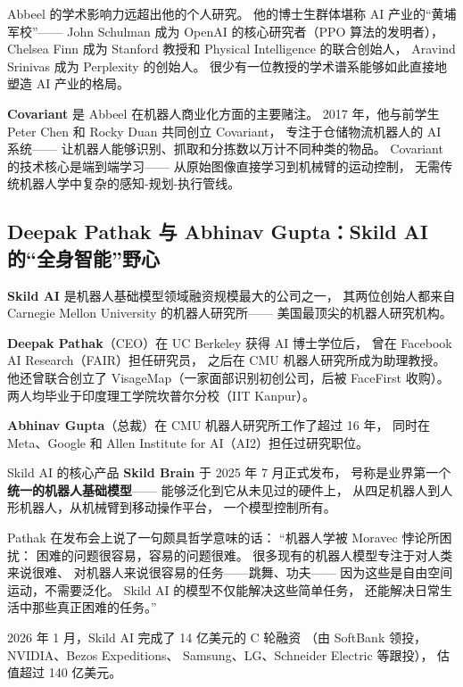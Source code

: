 Abbeel 的学术影响力远超出他的个人研究。
他的博士生群体堪称 AI 产业的``黄埔军校''——
John Schulman 成为 OpenAI 的核心研究者（PPO 算法的发明者），
Chelsea Finn 成为 Stanford 教授和 Physical Intelligence 的联合创始人，
Aravind Srinivas 成为 Perplexity 的创始人。
很少有一位教授的学术谱系能够如此直接地塑造 AI 产业的格局。

\textbf{Covariant} 是 Abbeel 在机器人商业化方面的主要赌注。
2017 年，他与前学生 Peter Chen 和 Rocky Duan 共同创立 Covariant，
专注于仓储物流机器人的 AI 系统——
让机器人能够识别、抓取和分拣数以万计不同种类的物品。
Covariant 的技术核心是端到端学习——
从原始图像直接学习到机械臂的运动控制，
无需传统机器人学中复杂的感知-规划-执行管线。


\subsection{Deepak Pathak 与 Abhinav Gupta：Skild AI 的``全身智能''野心}
\label{subsec:skild-ai}

\textbf{Skild AI} 是机器人基础模型领域融资规模最大的公司之一，
其两位创始人都来自 Carnegie Mellon University 的机器人研究所——
美国最顶尖的机器人研究机构。

\textbf{Deepak Pathak}（CEO）在 UC Berkeley 获得 AI 博士学位后，
曾在 Facebook AI Research（FAIR）担任研究员，
之后在 CMU 机器人研究所成为助理教授。
他还曾联合创立了 VisageMap（一家面部识别初创公司，后被 FaceFirst 收购）。
两人均毕业于印度理工学院坎普尔分校（IIT Kanpur）。

\textbf{Abhinav Gupta}（总裁）在 CMU 机器人研究所工作了超过 16 年，
同时在 Meta、Google 和 Allen Institute for AI（AI2）担任过研究职位。

Skild AI 的核心产品 \textbf{Skild Brain} 于 2025 年 7 月正式发布，
号称是业界第一个\textbf{统一的机器人基础模型}——
能够泛化到它从未见过的硬件上，
从四足机器人到人形机器人，从机械臂到移动操作平台，
一个模型控制所有。

Pathak 在发布会上说了一句颇具哲学意味的话：
``机器人学被 Moravec 悖论所困扰：
困难的问题很容易，容易的问题很难。
很多现有的机器人模型专注于对人类来说很难、
对机器人来说很容易的任务——跳舞、功夫——
因为这些是自由空间运动，不需要泛化。
Skild AI 的模型不仅能解决这些简单任务，
还能解决日常生活中那些真正困难的任务。''

2026 年 1 月，Skild AI 完成了 14 亿美元的 C 轮融资
（由 SoftBank 领投，NVIDIA、Bezos Expeditions、
Samsung、LG、Schneider Electric 等跟投），
估值超过 140 亿美元。


